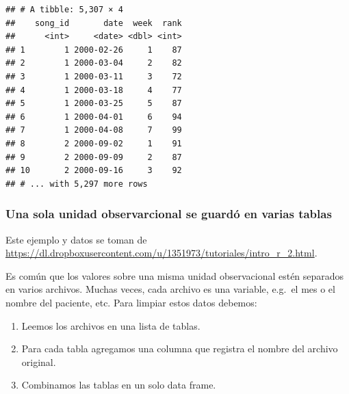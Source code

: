 \documentclass[]{article}
\newenvironment{Shaded}{\begin{snugshade}}{\end{snugshade}}
\newcommand{\KeywordTok}[1]{\textcolor[rgb]{0.13,0.29,0.53}{\textbf{{#1}}}}
\newcommand{\StringTok}[1]{\textcolor[rgb]{0.31,0.60,0.02}{{#1}}}
\newcommand{\NormalTok}[1]{{#1}}
\begin{document}
\begin{Shaded}
\end{Shaded}

\begin{verbatim}
## # A tibble: 5,307 × 4
##    song_id       date  week  rank
##      <int>     <date> <dbl> <int>
## 1        1 2000-02-26     1    87
## 2        1 2000-03-04     2    82
## 3        1 2000-03-11     3    72
## 4        1 2000-03-18     4    77
## 5        1 2000-03-25     5    87
## 6        1 2000-04-01     6    94
## 7        1 2000-04-08     7    99
## 8        2 2000-09-02     1    91
## 9        2 2000-09-09     2    87
## 10       2 2000-09-16     3    92
## # ... with 5,297 more rows
\end{verbatim}

\subsubsection{Una sola unidad observarcional se guardó en varias
tablas}\label{una-sola-unidad-observarcional-se-guardo-en-varias-tablas}

Este ejemplo y datos se toman de
\url{https://dl.dropboxusercontent.com/u/1351973/tutoriales/intro_r_2.html}.

Es común que los valores sobre una misma unidad observacional estén
separados en varios archivos. Muchas veces, cada archivo es una
variable, e.g.~el mes o el nombre del paciente, etc. Para limpiar estos
datos debemos:

\begin{enumerate}
\def\labelenumi{\arabic{enumi}.}
\itemsep1pt\parskip0pt
\item
  Leemos los archivos en una lista de tablas.
\item
  Para cada tabla agregamos una columna que registra el nombre del
  archivo original.
\item
  Combinamos las tablas en un solo data frame.
\end{enumerate}
\end{document}
